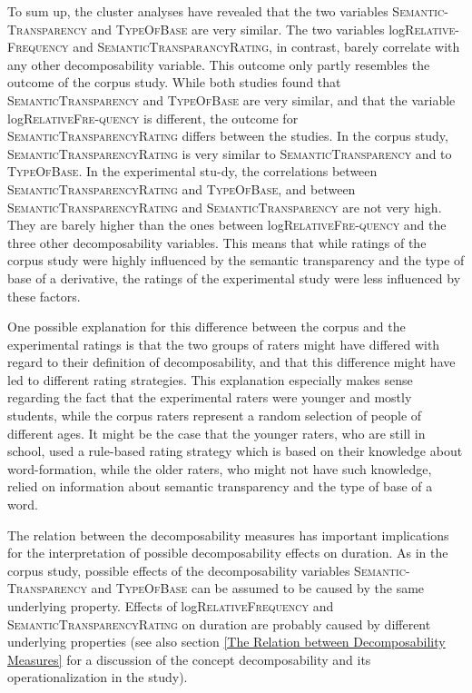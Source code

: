  
 To sum up, the cluster analyses have revealed that the two variables \textsc{Semantic-Transparency} and \textsc{TypeOfBase} are very similar. The two variables log\textsc{Relative- Frequency} and \textsc{SemanticTransparancyRating}, in contrast, barely correlate with any other decomposability variable.
This outcome only partly resembles the outcome of the corpus study. While both studies found that \textsc{SemanticTransparency} and \textsc{TypeOfBase} are very similar, and that the variable log\textsc{RelativeFre-quency} is different, the outcome for \textsc{SemanticTransparencyRating} differs between the studies. 
In the corpus study, \textsc{SemanticTransparencyRating} is very similar to \textsc{SemanticTransparency} and to \textsc{TypeOfBase}. In the experimental stu-dy, the correlations between \textsc{SemanticTransparencyRating} and \textsc{TypeOfBase}, and between \textsc{SemanticTransparencyRating}  and \textsc{SemanticTransparency} are not very high. They are barely higher than the ones between log\textsc{RelativeFre-quency} and the three other decomposability variables. 
This means that while ratings of the corpus study were highly influenced by the semantic transparency and the type of base of a derivative, the ratings of the experimental study were less influenced by these factors.

 
 One possible explanation for this difference between the corpus and the experimental ratings is that the two groups of raters might have differed with regard to their definition of decomposability, and that this difference might have led to different rating strategies. This explanation especially makes sense regarding the fact that the experimental raters were younger and mostly students, while the corpus raters represent a random selection of people of different ages. It might be the case that the younger raters, who are still in school, used a rule-based rating strategy which is based on their knowledge about word-formation, while the older raters, who might not have such knowledge, relied on information about semantic transparency and the type of base of a word. 

 The relation between the decomposability measures has important implications for the interpretation of possible decomposability effects on duration. As in the corpus study, possible effects of the decomposability variables \textsc{Semantic-Transparency} and \textsc{TypeOfBase} can be assumed to be caused by the same underlying property. 
 Effects of log\textsc{RelativeFrequency} and \textsc{SemanticTransparencyRating} on duration are probably caused by different underlying properties (see also section \ref{The Relation between Decomposability Measures} for a discussion of the concept decomposability and its operationalization in the study).
 





